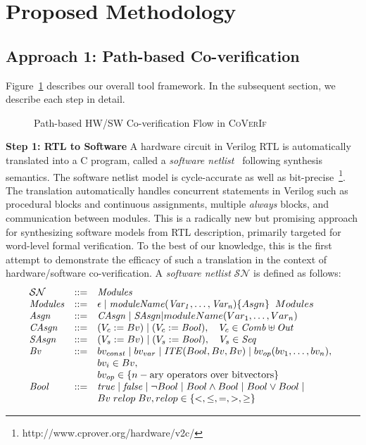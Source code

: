 \documentclass[sigconf]{acmart}
\newcommand{\tool}[1]{\textsc{#1}\xspace}
\newcommand{\verifox}{\tool{CoVerIf}}
\begin{document}
\section{Proposed Methodology}
%
\subsection{Approach 1: Path-based Co-verification}
%
Figure~\ref{proposed-flow} describes our overall tool framework. In the
subsequent section, we describe each step in detail.\\ 
%
\begin{figure}[t]
{}
\caption{\small Path-based HW/SW Co-verification Flow in \verifox
\label{proposed-flow}}
\end{figure}
%
\textbf{Step 1: RTL to Software}
A hardware circuit in Verilog RTL is automatically 
translated into a C program, called a 
\textit{software netlist}~\cite{mtk2016,mskm2016,mkm2015} following synthesis 
semantics. The software netlist model is cycle-accurate as well as 
bit-precise~\footnote{http://www.cprover.org/hardware/v2c/}. The 
translation automatically handles concurrent statements 
in Verilog such as procedural blocks and continuous assignments, multiple {\em always}
blocks, and communication between modules.  This is a radically new 
but promising approach for synthesizing software 
models from RTL description, primarily targeted for word-level formal verification.  
To the best of our knowledge, this is the first attempt to demonstrate the 
efficacy of such a translation in the context of hardware/software co-verification. 
% 
A \textit{software netlist} $\mathcal{SN}$ is defined as follows:
%
\[ 
\begin{array}[t]{@{}lll}
\mathcal{SN} & {:}{:}{=} & \mathit{Modules} \\
\mathit{Modules} & {:}{:}{=} & \epsilon \mid \mathit{moduleName(Var_1,\dots,Var_n)} \{ Asgn \} \;\; Modules \\
\mathit{Asgn} &  {:}{:}{=} & \mathit{CAsgn} \mid \mathit{SAsgn} | moduleName(Var_1,\dots,Var_n)\\
\mathit{CAsgn} & {:}{:}{=} & (V_c := Bv) \mid (V_c := \mathit{Bool}), \quad V_c \in \mathit{Comb} \uplus \mathit{Out} \\
\mathit{SAsgn} & {:}{:}{=} & (V_s := Bv) \mid (V_s := \mathit{Bool}), \quad V_s \in \mathit{Seq} \\
\mathit{Bv} &  {:}{:}{=} & bv_{const} \mid bv_{var} \mid
	\mathit{ITE}(Bool, Bv, Bv) \mid
bv_{op}(bv_1, \ldots, bv_n), \\
& & bv_i \in Bv, \\ 
& & bv_{op} \in \{n-\text{ary operators over bitvectors} \} \\
\mathit{Bool} & {:}{:}{=} & \mathit{true} \mid \mathit{false} \mid \neg{Bool} \mid Bool \land Bool \mid 
Bool \lor Bool \mid \\ 
& & Bv\; relop\; Bv, relop \in \{<,\leq,=,>,\geq\} \\
\end{array}
\]
\end{document}
